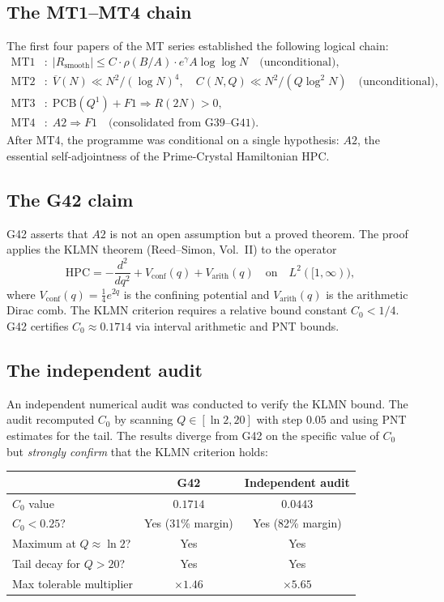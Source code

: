 \documentclass[11pt,a4paper]{article}
\begin{document}
\subsection{The MT1--MT4 chain}

The first four papers of the MT series established the following logical chain:
\begin{align*}
\text{MT1} &:\; |R_{\text{smooth}}| \le C\cdot\rho(B/A)\cdot e^\gamma A\log\log N \quad\text{(unconditional)}, \\
\text{MT2} &:\; \overline{V}(N) \ll N^2/(\log N)^4,\quad C(N,Q)\ll N^2/(Q\log^2 N) \quad\text{(unconditional)}, \\
\text{MT3} &:\; \text{PCB}(Q^1) + F1 \Longrightarrow R(2N)>0, \\
\text{MT4} &:\; A2 \Longrightarrow F1 \quad\text{(consolidated from G39--G41)}.
\end{align*}
After MT4, the programme was conditional on a single hypothesis: $A2$, the essential self-adjointness of the Prime-Crystal Hamiltonian $\mathrm{HPC}$.

\subsection{The G42 claim}

G42 asserts that $A2$ is not an open assumption but a proved theorem.  The proof applies the KLMN theorem (Reed--Simon, Vol.~II) to the operator
\[
\mathrm{HPC} = -\frac{d^2}{dq^2} + V_{\text{conf}}(q) + V_{\text{arith}}(q) \quad\text{on}\quad L^2([1,\infty)),
\]
where $V_{\text{conf}}(q) = \tfrac{1}{4}e^{2q}$ is the confining potential and $V_{\text{arith}}(q)$ is the arithmetic Dirac comb.  The KLMN criterion requires a relative bound constant $C_0 < 1/4$.  G42 certifies $C_0\approx 0.1714$ via interval arithmetic and PNT bounds.

\subsection{The independent audit}

An independent numerical audit was conducted to verify the KLMN bound.  The audit recomputed $C_0$ by scanning $Q\in[\ln 2, 20]$ with step $0.05$ and using PNT estimates for the tail.  The results diverge from G42 on the specific value of $C_0$ but \emph{strongly confirm} that the KLMN criterion holds:

\begin{center}
\begin{tabular}{@{}lcc@{}}
\toprule
& \textbf{G42} & \textbf{Independent audit} \\
\midrule
$C_0$ value & $0.1714$ & $0.0443$ \\
$C_0 < 0.25$? & Yes (31\% margin) & Yes (82\% margin) \\
Maximum at $Q\approx\ln 2$? & Yes & Yes \\
Tail decay for $Q>20$? & Yes & Yes \\
Max tolerable multiplier & $\times 1.46$ & $\times 5.65$ \\
\bottomrule
\end{tabular}
\end{center}
\end{document}
